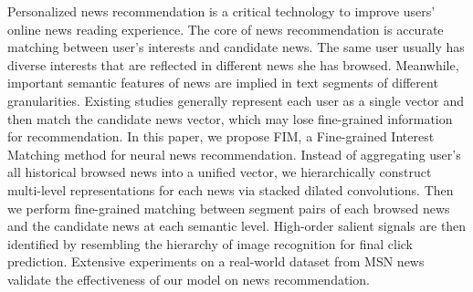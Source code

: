 Personalized news recommendation is a critical technology to improve users' online news reading experience. The core of news recommendation is accurate matching between user's interests and candidate news. The same user usually has diverse interests that are reflected in different news she has browsed. Meanwhile, important semantic features of news are implied in text segments of different granularities. Existing studies generally represent each user as a single vector and then match the candidate news vector, which may lose fine-grained information for recommendation. In this paper, we propose FIM, a Fine-grained Interest Matching method for neural news recommendation. Instead of aggregating user's all historical browsed news into a unified vector, we hierarchically construct multi-level representations for each news via stacked dilated convolutions. Then we perform fine-grained matching between segment pairs of each browsed news and the candidate news at each semantic level. High-order salient signals are then identified by resembling the hierarchy of image recognition for final click prediction. Extensive experiments on a real-world dataset from MSN news validate the effectiveness of our model on news recommendation.
